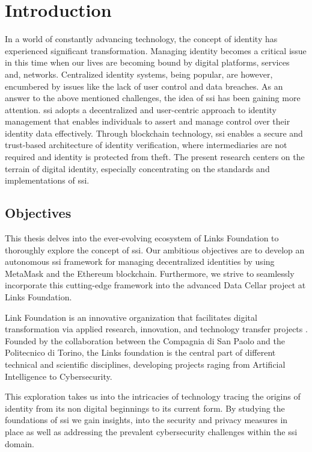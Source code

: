 \chapter{Introduction} \label{ch:introduction}

In a world of constantly advancing technology, the concept of identity has experienced significant transformation. Managing identity becomes a critical issue in this
time when our lives are becoming bound by digital platforms, services and, networks. Centralized identity systems, being popular, are however, encumbered by 
issues like the lack of user control and data breaches. As an answer to the above mentioned challenges, the idea of \acrfull{ssi} has been gaining more attention. \gls{ssi} 
adopts a decentralized and user-centric approach to identity management that enables individuals to assert and manage control over their identity data effectively. 
Through blockchain technology, \gls{ssi} enables a secure and trust-based architecture of identity verification, where intermediaries are not required and identity is 
protected from theft. The present research centers on the terrain of digital identity, especially concentrating on the standards and implementations of \gls{ssi}.

\section{Objectives} 

This thesis delves into the ever-evolving ecosystem of Links Foundation to thoroughly explore the concept of \gls{ssi}. Our ambitious objectives 
are to develop an autonomous \gls{ssi} framework for managing decentralized identities by using MetaMask and the Ethereum blockchain. Furthermore, we strive to 
seamlessly incorporate this cutting-edge framework into the advanced Data Cellar project at Links Foundation.

Link Foundation is an innovative organization that facilitates digital transformation via applied research, innovation, and technology transfer projects \cite{linksfoundation}.
Founded by the collaboration between the Compagnia di San Paolo and the Politecnico di Torino, the Links foundation is the central part of different technical and scientific 
disciplines, developing projects raging from Artificial Intelligence to Cybersecurity.

This exploration takes us into the intricacies of technology tracing the origins of identity from its non digital beginnings to its current form. By studying the foundations
of \gls{ssi} we gain insights, into the security and privacy measures in place as well as addressing the prevalent cybersecurity challenges within the \gls{ssi} domain.

